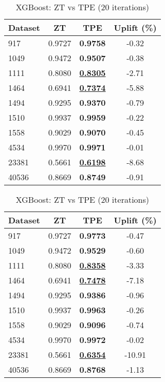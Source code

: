\begin{table}[htbp]
\begin{center}
\begin{small}
\begin{sc}
\begin{subtable}[t]{0.48\textwidth}
    \centering
    \caption{XGBoost: ZT vs TPE (10 iterations)}
    \label{tab:xgboost-zt-vs-tpe-10}
    \begin{tabular}{lccc}
    \toprule
    \textbf{Dataset} & \textbf{ZT} & \textbf{TPE} & \textbf{Uplift (\%)} \\
    \midrule
    917    & 0.9727 & \textbf{0.9758} & -0.32 \\
    1049    & 0.9472 & \textbf{0.9507} & -0.38 \\
    1111    & 0.8080 & \underline{\textbf{0.8305}} & -2.71 \\
    1464    & 0.6941 & \underline{\textbf{0.7374}} & -5.88 \\
    1494    & 0.9295 & \textbf{0.9370} & -0.79 \\
    1510    & 0.9937 & \textbf{0.9959} & -0.22 \\
    1558    & 0.9029 & \textbf{0.9070} & -0.45 \\
    4534    & 0.9970 & \textbf{0.9971} & -0.01 \\
    23381    & 0.5661 & \underline{\textbf{0.6198}} & -8.68 \\
    40536    & 0.8669 & \textbf{0.8749} & -0.91 \\
    \bottomrule
    \end{tabular}
\end{subtable}
\hfill
\begin{subtable}[t]{0.48\textwidth}
    \centering
    \caption{XGBoost: ZT vs TPE (20 iterations)}
    \label{tab:xgboost-zt-vs-tpe-20}
    \begin{tabular}{lccc}
    \toprule
    \textbf{Dataset} & \textbf{ZT} & \textbf{TPE} & \textbf{Uplift (\%)} \\
    \midrule
    917    & 0.9727 & \textbf{0.9773} & -0.47 \\
    1049    & 0.9472 & \textbf{0.9529} & -0.60 \\
    1111    & 0.8080 & \underline{\textbf{0.8358}} & -3.33 \\
    1464    & 0.6941 & \underline{\textbf{0.7478}} & -7.18 \\
    1494    & 0.9295 & \textbf{0.9386} & -0.96 \\
    1510    & 0.9937 & \textbf{0.9963} & -0.26 \\
    1558    & 0.9029 & \textbf{0.9096} & -0.74 \\
    4534    & 0.9970 & \textbf{0.9972} & -0.02 \\
    23381    & 0.5661 & \underline{\textbf{0.6354}} & -10.91 \\
    40536    & 0.8669 & \textbf{0.8768} & -1.13 \\
    \bottomrule
    \end{tabular}
\end{subtable}

\end{sc}
\end{small}
\end{center}
\vskip -0.1in
\end{table}